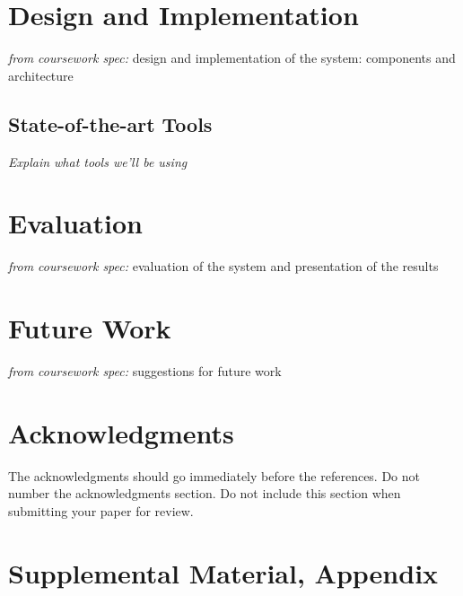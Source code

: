 \documentclass[11pt]{article}
\begin{document}
\section{Design and Implementation}
\label{sec:implementation}

\textit{from coursework spec:} design and implementation of the system: components and architecture

\subsection{State-of-the-art Tools}
\label{subsec:tools}
\textit{Explain what tools we'll be using}


\section{Evaluation}
\label{sec:evaluation}

\textit{from coursework spec:} evaluation of the system and presentation of the results


\section{Future Work}
\label{sec:future_work}

\textit{from coursework spec:} suggestions for future work


\section*{Acknowledgments}
\label{sec:acknowledgments}

The acknowledgments should go immediately before the references.  Do
not number the acknowledgments section. Do not include this section
when submitting your paper for review.

%
%



\appendix

\section{Supplemental Material, Appendix}
\label{sec:supplemental}
\end{document}
